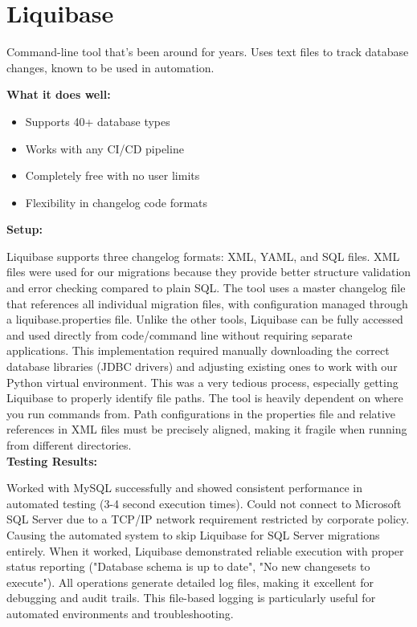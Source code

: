 \documentclass[11pt,a4paper]{article}
\begin{document}
\newpage
\section{Liquibase}

Command-line tool that's been around for years. Uses text files to track database changes, known to be used in automation.

\textbf{What it does well:}
\begin{itemize}
    \item Supports 40+ database types
    \item Works with any CI/CD pipeline
    \item Completely free with no user limits
    \item Flexibility in changelog code formats
\end{itemize}

\textbf{Setup:}

Liquibase supports three changelog formats: XML, YAML, and SQL files.
XML files were used for our migrations because they provide better structure validation and error checking compared to plain SQL.
The tool uses a master changelog file that references all individual migration files, with configuration managed through a liquibase.properties file. 
Unlike the other tools, Liquibase can be fully accessed and used directly from code/command line without requiring separate applications.
This implementation required manually downloading the correct database libraries (JDBC drivers) and adjusting existing ones to work with our Python virtual environment.
This was a very tedious process, especially getting Liquibase to properly identify file paths.
The tool is heavily dependent on where you run commands from.
Path configurations in the properties file and relative references in XML files must be precisely aligned, making it fragile when running from different directories.\\

\textbf{Testing Results:}

Worked with MySQL successfully and showed consistent performance in automated testing (3-4 second execution times).
Could not connect to Microsoft SQL Server due to a TCP/IP network requirement restricted by corporate policy. 
Causing the automated system to skip Liquibase for SQL Server migrations entirely.
When it worked, Liquibase demonstrated reliable execution with proper status reporting ("Database schema is up to date", "No new changesets to execute").
All operations generate detailed log files, making it excellent for debugging and audit trails.
This file-based logging is particularly useful for automated environments and troubleshooting.\\
\end{document}
